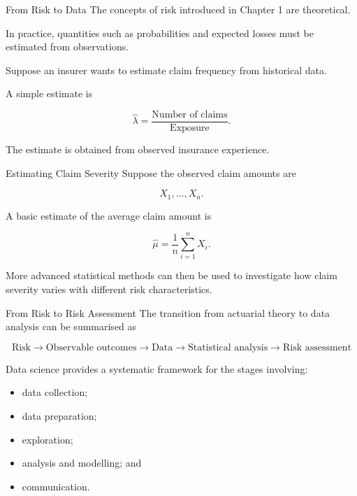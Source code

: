 \documentclass[
  ignorenonframetext,
  aspectratio=169,
]{beamer}
\providecommand{\tightlist}{%
  \setlength{\itemsep}{0pt}\setlength{\parskip}{0pt}}
\begin{document}
\begin{frame}{From Risk to Data}
\protect{}\label{from-risk-to-data}
The concepts of risk introduced in Chapter 1 are theoretical.

In practice, quantities such as probabilities and expected losses must
be estimated from observations.

Suppose an insurer wants to estimate claim frequency from historical
data.

A simple estimate is

\[
\widehat{\lambda}
=
\frac{\text{Number of claims}}
{\text{Exposure}}.
\]

The estimate is obtained from observed insurance experience.
\end{frame}

\begin{frame}{Estimating Claim Severity}
\protect{}\label{estimating-claim-severity}
Suppose the observed claim amounts are

\[
X_1,\ldots,X_n.
\]

A basic estimate of the average claim amount is

\[
\widehat{\mu}
=
\frac{1}{n}\sum_{i=1}^{n}X_i.
\]

More advanced statistical methods can then be used to investigate how
claim severity varies with different risk characteristics.
\end{frame}

\begin{frame}{From Risk to Risk Assessment}
\protect{}\label{from-risk-to-risk-assessment}
The transition from actuarial theory to data analysis can be summarised
as

\[
\boxed{
\text{Risk}
\rightarrow
\text{Observable outcomes}
\rightarrow
\text{Data}
\rightarrow
\text{Statistical analysis}
\rightarrow
\text{Risk assessment}
}
\]

Data science provides a systematic framework for the stages involving:

\begin{itemize}
\tightlist
\item
  data collection;
\item
  data preparation;
\item
  exploration;
\item
  analysis and modelling; and
\item
  communication.
\end{itemize}
\end{frame}
\end{document}
